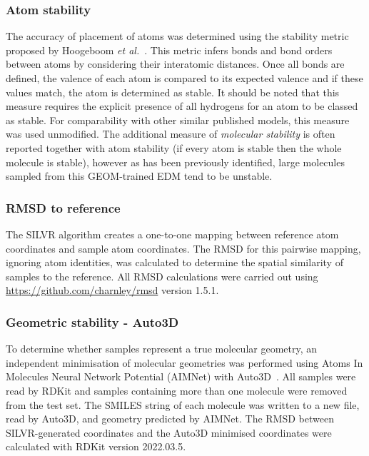 \documentclass[journal=jacsat,manuscript=article]{achemso}
\begin{document}
\subsubsection{Atom stability}
The accuracy of placement of atoms was determined using the stability metric proposed by Hoogeboom \textit{et al.}~\cite{hoogeboom2022equivariant}. This metric infers bonds and bond orders between atoms by considering their interatomic distances. Once all bonds are defined, the valence of each atom is compared to its expected valence and if these values match, the atom is determined as stable. It should be noted that this measure requires the explicit presence of all hydrogens for an atom to be classed as stable. For comparability with other similar published models, this measure was used unmodified. The additional measure of \textit{molecular stability} is often reported together with atom stability (if every atom is stable then the whole molecule is stable), however as has been previously identified, large molecules sampled from this GEOM-trained EDM tend to be unstable.

\subsubsection{RMSD to reference}
The SILVR algorithm creates a one-to-one mapping between reference atom coordinates and sample atom coordinates. The RMSD for this pairwise mapping, ignoring atom identities, was calculated to determine the spatial similarity of samples to the reference. All RMSD calculations were carried out using \url{https://github.com/charnley/rmsd} version 1.5.1.

\subsubsection{Geometric stability - Auto3D}
To determine whether samples represent a true molecular geometry, an independent minimisation of molecular geometries was performed using Atoms In Molecules Neural Network Potential (AIMNet) with Auto3D~\cite{liu2022auto3d}. All samples were read by RDKit and samples containing more than one molecule were removed from the test set. The SMILES string of each molecule was written to a new file, read by Auto3D, and geometry predicted by AIMNet. The RMSD between SILVR-generated coordinates and the Auto3D minimised coordinates were calculated with RDKit version 2022.03.5.
\end{document}
